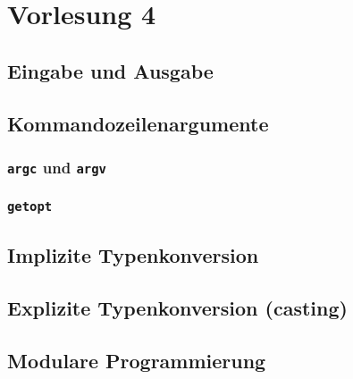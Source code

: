 \section{Vorlesung 4}

\setcounter{minutecounter}{0}

\subsection{Eingabe und Ausgabe}

\iflecturer
\begin{framed}
\end{framed}
\fi

\subsection{Kommandozeilenargumente}

\iflecturer
\begin{framed}
\end{framed}
\fi

\subsubsection{\texttt{argc} und \texttt{argv}}

\subsubsection{\texttt{getopt}}

\subsection{Implizite Typenkonversion}

\subsection{Explizite Typenkonversion (casting)}

\subsection{Modulare Programmierung}

\iflecturer
\begin{framed}
\end{framed}
\fi

